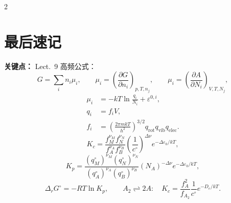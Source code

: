 \documentclass[a4paper,9pt]{article}
\newenvironment{keypoint}
{\par\vspace{0.3em}\noindent\begin{tcolorbox}[colback=keybg,colframe=keycolor,boxrule=0.5pt,arc=2pt,left=2pt,right=2pt,top=2pt,bottom=2pt,boxsep=0pt]\noindent\textcolor{keycolor}{\textbf{关键点：}}}
{\end{tcolorbox}\par\vspace{0.3em}}
\begin{document}
\begin{multicols}{2}
	\section{最后速记}
	\begin{keypoint}
		Lect.~9 高频公式：
		\[
			G=\sum_i n_i\mu_i,
			\qquad
			\mu_i=\left(\frac{\partial G}{\partial n_i}\right)_{p,T,n_j},
			\qquad
			\mu_i=\left(\frac{\partial A}{\partial N_i}\right)_{V,T,N_j},
		\]
		\[
			\begin{aligned}
				\mu_i & =-kT\ln\frac{q_i}{N_i}+\varepsilon^{0,i},                                                  \\
				q_i   & =f_iV,                                                                                     \\
				f_i   & =\left(\frac{2\pi mkT}{h^2}\right)^{3/2}q_{\mathrm{rot}}q_{\mathrm{vib}}q_{\mathrm{elec}}.
			\end{aligned}
		\]
		\[
			K_c=\frac{f_M^{\nu_M}f_N^{\nu_N}}{f_A^{\nu_A}f_B^{\nu_B}}\left(\frac1{c^\circ}\right)^{\Delta\nu}e^{-\Delta\varepsilon_0/kT},
		\]
		\[
			K_p=\frac{(q_M^\circ)^{\nu_M}(q_N^\circ)^{\nu_N}}{(q_A^\circ)^{\nu_A}(q_B^\circ)^{\nu_B}}(N_A)^{-\Delta\nu}e^{-\Delta\varepsilon_0/kT},
		\]
		\[
			\Delta_rG^\circ=-RT\ln K_p,
			\qquad
			A_2\rightleftharpoons 2A:\quad K_c=\frac{f_A^2}{f_{A_2}}\frac1{c^\circ}e^{-D_e/kT}.
		\]
	\end{keypoint}

\end{multicols}
\end{document}
